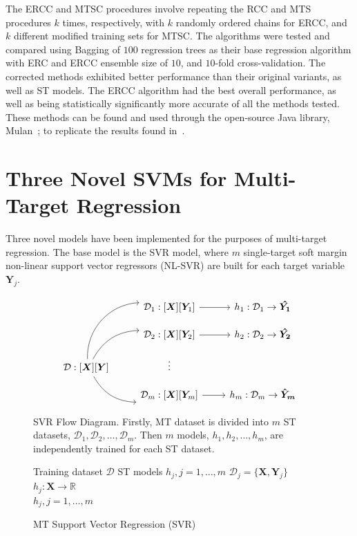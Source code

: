 \documentclass[reqno]{vcuthesis}
\numberwithin{equation}{chapter}
\begin{document}
The ERCC and MTSC procedures involve repeating the RCC and MTS procedures $k$ times, respectively, with $k$ randomly ordered chains for ERCC, and $k$ different modified training sets for MTSC. The algorithms were tested and compared using Bagging of $100$ regression trees as their base regression algorithm with ERC and ERCC ensemble size of $10$, and $10$-fold cross-validation. The corrected methods exhibited better performance than their original variants, as well as ST models. The ERCC algorithm had the best overall performance, as well as being statistically significantly more accurate of all the methods tested. These methods can be found and used through the open-source Java library, Mulan~\cite{mulan}; to replicate the results found in~\cite{Spyromitros2014}.

\section{Three Novel SVMs for Multi-Target Regression}\label{sec:MTRproposal}
Three novel models have been implemented for the purposes of multi-target regression. The base model is the SVR model, where $m$ single-target soft margin non-linear support vector regressors (NL-SVR) are built for each target variable $\bm Y_j$. 
\begin{figure}[b!]
\begin{minipage}{0.9\textwidth}
\small \centering
\[\begin{tikzcd}[column sep = small, row sep = small]
& & \mathcal{D}_1 :  [\bm X][\bm Y_1]  \arrow[rr]  & & h_1 :  \mathcal{D}_1 \rightarrow \bm{\hat{Y_1}}\\
& & \mathcal{D}_2 :  [\bm X][\bm Y_2]  \arrow[rr] & & h_2 :  \mathcal{D}_2 \rightarrow \bm{\hat{Y_2}} \\        
\mathcal{D} :  [\bm X][\bm Y]  \arrow[uurr, bend left=45] \arrow[urr, bend left] \arrow[drr, bend right]  		& & \vdots \\
& & \mathcal{D}_m :  [\bm X][\bm Y_m] \arrow[rr] & & h_m :  \mathcal{D}_m \rightarrow \bm{\hat{Y}_m}
\end{tikzcd}\]
\end{minipage}
\caption{SVR Flow Diagram. Firstly, MT dataset is divided into $m$ ST datasets, $\mathcal{D}_1, \mathcal{D}_2, \ldots, \mathcal{D}_m$. Then $m$ models, $h_1, h_2, \ldots, h_m$, are independently trained for each ST dataset.}\label{diag:SVR}
\begin{algorithm}[H]
\caption{MT Support Vector Regression (SVR)} \label{alg:SVR} 
\small \centering
\begin{algorithmic}[1]
\renewcommand{\algorithmicrequire}{\textbf{Input:}}
\renewcommand{\algorithmicensure}{\textbf{Output:}}
\Require Training dataset $\mathcal{D}$
\Ensure  ST models $h_j, j = 1,\ldots,m$
\State $\mathcal{D}_j = \{\bm X, \bm Y_j\}$ 
\State $h_j : \bm X \rightarrow \mathbb{R}$ 
\EndFor \\
\Return $h_j, j=1,\ldots,m$ 
\end{algorithmic} 
\end{algorithm}
\end{figure}
\end{document}
